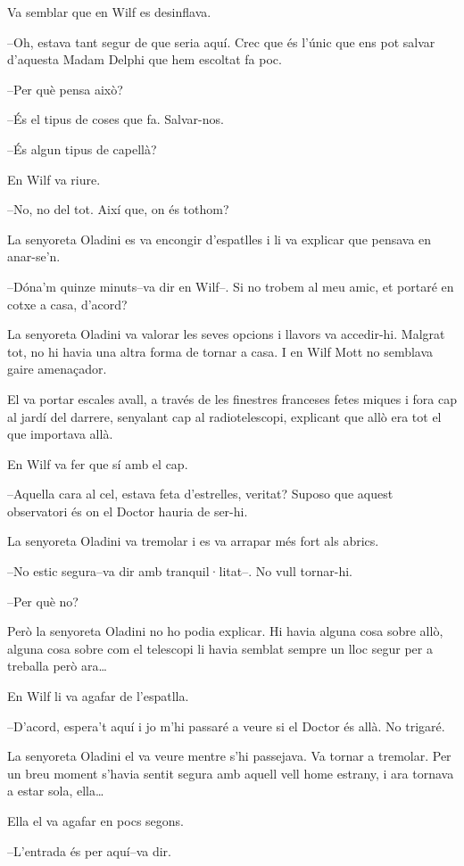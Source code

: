 Va semblar que en Wilf es desinflava.

--Oh, estava tant segur de que seria aquí. Crec que és l'únic que ens
pot salvar d'aquesta Madam Delphi que hem escoltat fa poc.

--Per què pensa això?

--És el tipus de coses que fa. Salvar-nos.

--És algun tipus de capellà?

En Wilf va riure.

--No, no del tot. Així que, on és tothom?

La senyoreta Oladini es va encongir d'espatlles i li va explicar que
pensava en anar-se'n.

--Dóna'm quinze minuts--va dir en Wilf--. Si no trobem al meu amic, et
portaré en cotxe a casa, d'acord?

La senyoreta Oladini va valorar les seves opcions i llavors va
accedir-hi. Malgrat tot, no hi havia una altra forma de tornar a casa. I
en Wilf Mott no semblava gaire amenaçador.

El va portar escales avall, a través de les finestres franceses fetes
miques i fora cap al jardí del darrere, senyalant cap al radiotelescopi,
explicant que allò era tot el que importava allà.

En Wilf va fer que sí amb el cap.

--Aquella cara al cel, estava feta d'estrelles, veritat? Suposo que
aquest observatori és on el Doctor hauria de ser-hi.

La senyoreta Oladini va tremolar i es va arrapar més fort als abrics.

--No estic segura--va dir amb tranquil·litat--. No vull tornar-hi.

--Per què no?

Però la senyoreta Oladini no ho podia explicar. Hi havia alguna cosa
sobre allò, alguna cosa sobre com el telescopi li havia semblat sempre
un lloc segur per a treballa però ara\ldots{}

En Wilf li va agafar de l'espatlla.

--D'acord, espera't aquí i jo m'hi passaré a veure si el Doctor és allà.
No trigaré.

La senyoreta Oladini el va veure mentre s'hi passejava. Va tornar a
tremolar. Per un breu moment s'havia sentit segura amb aquell vell home
estrany, i ara tornava a estar sola, ella\ldots{}

Ella el va agafar en pocs segons.

--L'entrada és per aquí--va dir.

